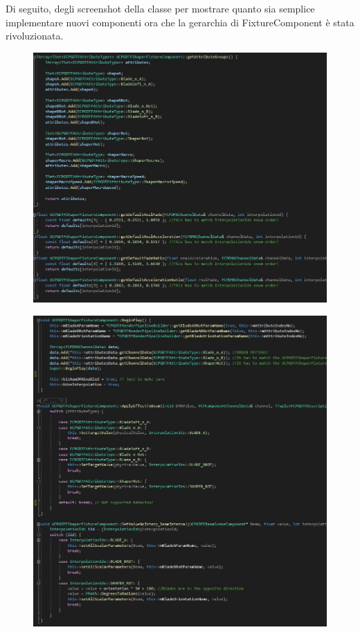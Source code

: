 \documentclass[main.tex]{subfiles}
\begin{document}
Di seguito, degli screenshot della classe per mostrare quanto sia semplice implementare nuovi componenti ora che la gerarchia di FixtureComponent è stata rivoluzionata.
\begin{figure}[H]
    \centering
    \includegraphics[width=1\linewidth]{img/newFeatures/ShaperComponentCode1.jpg}
    \label{fig:5_ShaperComponentCode1}
\end{figure}
\begin{figure}[H]
    \centering
    \includegraphics[width=1\linewidth]{img/newFeatures/ShaperComponentCode2.jpg}
    \label{fig:5_ShaperComponentCode2}
\end{figure}
\end{document}
